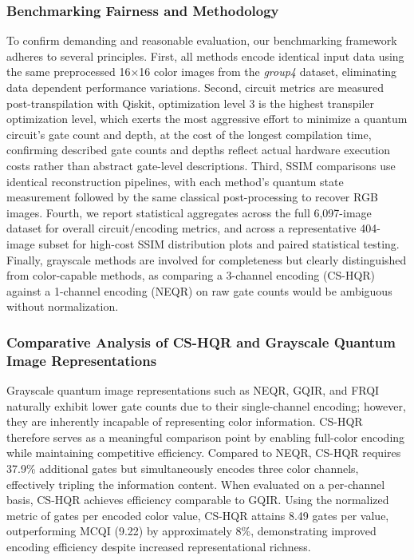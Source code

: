 \documentclass[11pt,a4paper]{article}
\begin{document}
\subsubsection{Benchmarking Fairness and Methodology}
To confirm demanding and reasonable evaluation, our benchmarking framework adheres to several principles. First, all methods encode identical input data using the same preprocessed 16×16 color images from the \textit{group4} dataset, eliminating data dependent performance variations. Second, circuit metrics are measured post-transpilation with Qiskit, optimization level 3 is the highest transpiler optimization level, which exerts the most aggressive effort to minimize a quantum circuit's gate count and depth, at the cost of the longest compilation time, confirming described gate counts and depths reflect actual hardware execution costs rather than abstract gate-level descriptions. Third, SSIM comparisons use identical reconstruction pipelines, with each method's quantum state measurement followed by the same classical post-processing to recover RGB images. Fourth, we report statistical aggregates across the full 6,097-image dataset for overall circuit/encoding metrics, and across a representative 404-image subset for high-cost SSIM distribution plots and paired statistical testing. Finally, grayscale methods are involved for completeness but clearly distinguished from color-capable methods, as comparing a 3-channel encoding (CS-HQR) against a 1-channel encoding (NEQR) on raw gate counts would be ambiguous without normalization.

\subsubsection{Comparative Analysis of CS-HQR and Grayscale Quantum Image Representations}

Grayscale quantum image representations such as NEQR, GQIR, and FRQI naturally exhibit lower gate counts due to their single-channel encoding; however, they are inherently incapable of representing color information. CS-HQR therefore serves as a meaningful comparison point by enabling full-color encoding while maintaining competitive efficiency. Compared to NEQR, CS-HQR requires 37.9\% additional gates but simultaneously encodes three color channels, effectively tripling the information content. When evaluated on a per-channel basis, CS-HQR achieves efficiency comparable to GQIR. Using the normalized metric of gates per encoded color value, CS-HQR attains 8.49 gates per value, outperforming MCQI (9.22) by approximately 8\%, demonstrating improved encoding efficiency despite increased representational richness.
\end{document}

